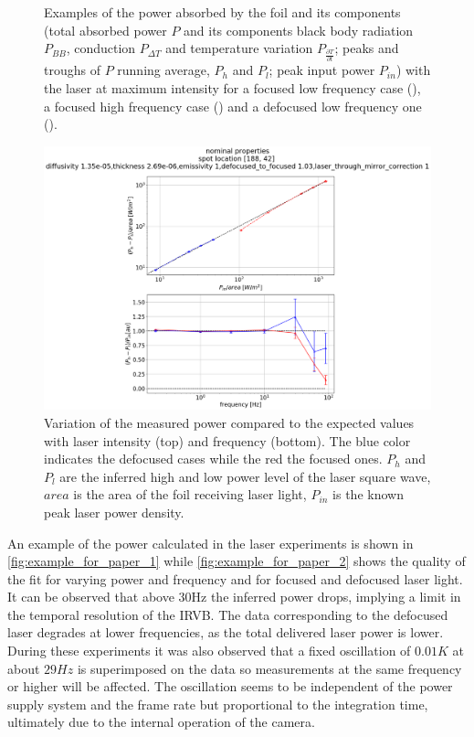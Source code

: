 \begin{figure}
\begin{subfigure}{0.62\linewidth}
        \vspace*{-5mm}
        {\color{white}\caption{\phantom{ }}\label{fig:example_for_paper_12}}
     \end{subfigure}
        \caption{Examples of the power absorbed by the foil and its components (total absorbed power $P$ and its components black body radiation $P_{BB}$, conduction $P_{\Delta T}$ and temperature variation $P_{\frac {\partial T} {\partial t}}$; peaks and troughs of $P$ running average, $P_h$ and $P_l$; peak input power $P_{in}$) with the laser at maximum intensity for a focused low frequency case (), a focused high frequency case () and a defocused low frequency one ().}
        \label{fig:example_for_paper_1}
\end{figure}

\begin{figure}
	\centering
	\includegraphics[trim={290 0 330 100},clip,width=0.65\linewidth]{Chapters/chapter2/figs/example_for_paper_24.png}
	\caption{Variation of the measured power compared to the expected values with laser intensity (top) and frequency (bottom). The blue color indicates the defocused cases while the red the focused ones. $P_h$ and $P_l$ are the inferred high and low power level of the laser square wave, $area$ is the area of the foil receiving laser light, $P_{in}$ is the known peak laser power density.}
	\label{fig:example_for_paper_2}
\end{figure}

An example of the power calculated in the laser experiments is shown in \autoref{fig:example_for_paper_1} while \autoref{fig:example_for_paper_2} shows the quality of the fit for varying power and frequency and for focused and defocused laser light. It can be observed that above 30Hz the inferred power drops, implying a limit in the temporal resolution of the IRVB. The data corresponding to the defocused laser degrades at lower frequencies, as the total delivered laser power is lower. During these experiments it was also observed that a fixed oscillation of $0.01K$ at about $29Hz$ is superimposed on the data so measurements at the same frequency or higher will be affected. The oscillation seems to be independent of the power supply system and the frame rate but proportional to the integration time, ultimately due to the internal operation of the camera.


